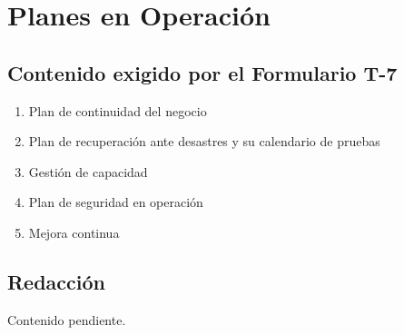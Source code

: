 \section{Planes en Operación}

%

\subsection{Contenido exigido por el Formulario T-7}

\begin{enumerate}
    \item Plan de continuidad del negocio
    \item Plan de recuperación ante desastres y su calendario de pruebas
    \item Gestión de capacidad
    \item Plan de seguridad en operación
    \item Mejora continua
\end{enumerate}

\subsection{Redacción}

Contenido pendiente.
